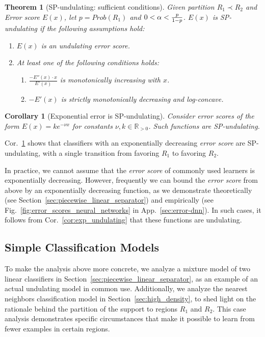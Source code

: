 \documentclass{article}
\newcommand{\R}{\mathbb{R}}
\newcommand{\pR}{1}\newcommand{\rR}{2}\newcommand{\prR}{i}
\newcommand{\prn}{\R_{> 0}}
\newcommand{\app}{App.}
\newtheorem{theorem}{Theorem}
\newtheorem{corollary}{Corollary}
\begin{document}
\begin{theorem}[SP-undulating: sufficient conditions]
\label{thm:suffiecnt_coniditions_sp_undulating}
Given partition $R_\pR\prec R_\rR$ and Error score $E(x)$, let $p=Prob(R_\pR)$ and $0<\alpha<\frac{p}{1-p}$.  $E(x)$ is SP-undulating if the following assumptions hold:
\begin{enumerate}\item $E(x)$ is an undulating \emph{error score}.
\item At least one of the following conditions holds:
\begin{enumerate}
\item $\frac{-E''\left(x\right)\cdot x}{E'\left(x\right)}$ is
monotonically increasing with $x$.
\item $-E'(x)$ is strictly monotonically decreasing and log-concave. 
\end{enumerate}

\end{enumerate}
\end{theorem}

\begin{corollary}[Exponential error is SP-undulating]
\label{cor:exp}
Consider \emph{error scores} of the form $E(x) = k e^{-\nu x}$
for constants $\nu,k\in\prn$. Such functions are SP-undulating. 
\end{corollary}
Cor.~\ref{cor:exp} shows that classifiers with an exponentially decreasing \emph{error score} are SP-undulating, with a single transition from favoring $R_\pR$ to favoring $R_\rR$.





In practice, we cannot assume that the \emph{error score} of commonly used learners is exponentially decreasing. However, frequently we can bound the \emph{error score} from above by an exponentially decreasing function, as we demonstrate theoretically (see Section~\ref{sec:piecewise_linear_separator}) and empirically (see Fig.~\ref{fig:error_scores_neural_networks} in \app~\ref{sec:error-dnn}). In such cases, it follows from Cor.~\ref{cor:exp_undulating} that these functions are undulating.  






\subsection{Simple Classification Models}
\label{sec:common}

To make the analysis above more concrete, we analyze a mixture model of two linear classifiers in Section~\ref{sec:piecewise_linear_separator}, as an example of an actual undulating model in common use. Additionally, we analyze the nearest neighbors classification model in Section~\ref{sec:high_density}, to shed light on the rationale behind the partition of the support to regions $R_\pR$ and $R_\rR$. This case analysis demonstrates specific circumstances that make it possible to learn from fewer examples in certain regions.
\end{document}
